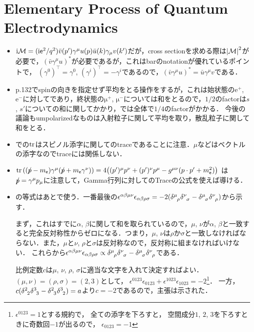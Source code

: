 \section{Elementary Process of Quantum Electrodynamics}
\begin{itemize}
	\item $\i\M = (\i\elec^2/q^2)\bar{v}(p')\gamma^{\mu}u(p)\bar{u}(k)\gamma_{\mu}v(k')$だが，cross sectionを求める際は$\abs{\M}^2$が必要で，$(\bar{v}\gamma^{\mu}u)^{*}$が必要であるが，これはbarのnotationが優れているポイントで，
		$(\gamma^0)^{\top} = \gamma^{0}$, $(\gamma^{i})^{\top} =- \gamma^{i}$であるので，$(\bar{v}\gamma^{\mu}u)^{*} = \bar{u}\gamma^{\mu}v$である．
	\item p.132でspinの向きを指定せず平均をとる操作をするが，これは始状態の$\mathrm{e^+}$, $\mathrm{e^-}$に対してであり，終状態の$\mathrm{\mu^+}$, $\mathrm{\mu^-}$については和をとるので，$1/2$のfactorは$s$, $s'$についての和に関してかかり，では全体で$1/4$のfactorがかかる．
		今後の議論もumpolarizedなものは入射粒子に関して平均を取り，散乱粒子に関して和をとる．
	\item {}での$\tr$はスピノル添字に関してのtraceであることに注意．$\mu$などはベクトルの添字なのでtraceには関係しない．
	\item $\tr\qty((\slashed{p} -m_{\elec})\gamma^{\mu}(\slashed{p}+m_{\elec}\gamma^{\nu})) = 4\qty((p')^\mu p^\nu + (p')^\nu p^\mu - g^{\mu\nu}(p\cdot p' + m_\elec^2))$
		は$\slashed{p} = \gamma^{\mu} p_\mu$に注意して，Gamma行列に対してのTraceの公式を使えば導ける．
	\item {}の等式はあとで使う．一番最後の$\epsilon^{\alpha\beta\mu\nu} \epsilon_{\alpha\beta\rho\sigma} = -2(\delta\indices{^\mu_\rho}\delta\indices{^\nu_\sigma} - \delta\indices{^\mu_\sigma}\delta\indices{^\nu_\rho})$から示す．

		まず，これはすでに$\alpha$, $\beta$に関して和を取られているので，$\mu$, $\nu$が$\alpha$, $\beta$と一致すると完全反対称性からゼロになる．つまり，$\mu$, $\nu$は$\rho$か$\sigma$と一致しなければならない．また，$\mu$と$\nu$, $\rho$と$\sigma$は反対称なので，反対称に組まなければいけない．
		これらから$\epsilon^{\alpha\beta\mu\nu} \epsilon_{\alpha\beta\rho\sigma} \propto \delta\indices{^\mu_\rho}\delta\indices{^\nu_\sigma} - \delta\indices{^\mu_\sigma}\delta\indices{^\nu_\rho}$である．
		
		比例定数$c$は$\mu$, $\nu$, $\rho$, $\sigma$に適当な文字を入れて決定すればよい．$(\mu, \nu) = (\rho, \sigma) = (2, 3)$として，
		$\epsilon^{0123}\epsilon_{0123}  + \epsilon^{1023}\epsilon_{1023} = -2$\footnote{$\epsilon^{0123} = 1$とする規約で，
		全ての添字を下ろすと，
		空間成分$1$, $2$, $3$を下ろすときに奇数回$-1$が出るので，
		$\epsilon_{0123} = -1$}．
		一方，$c(\delta\indices{^2_2}\delta\indices{^3_3} - \delta\indices{^2_3}\delta\indices{^3_2}) = a$より$c = -2$であるので，主張は示された．


\end{itemize}
